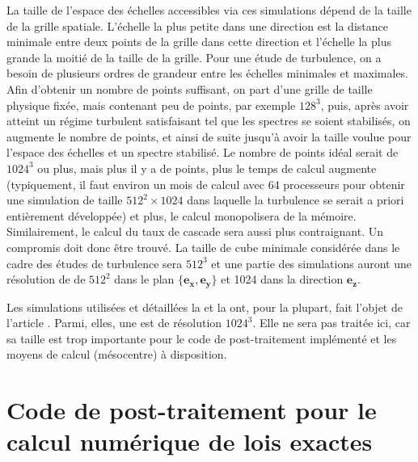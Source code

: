 La taille de l'espace des échelles accessibles via ces simulations dépend de la taille de la grille spatiale. L'échelle la plus petite dans une direction est la distance minimale entre deux points de la grille dans cette direction et l'échelle la plus grande la moitié de la taille de la grille. Pour une étude de turbulence, on a besoin de plusieurs ordres de grandeur entre les échelles minimales et maximales. Afin d'obtenir un nombre de points suffisant, on part d'une grille de taille physique fixée, mais contenant peu de points, par exemple $128^3$, puis, après avoir atteint un régime turbulent satisfaisant tel que les spectres se soient stabilisés, on augmente le nombre de points, et ainsi de suite jusqu'à avoir la taille voulue pour l'espace des échelles et un spectre stabilisé. Le nombre de points idéal serait de $1024^3$ ou plus, mais plus il y a de points, plus le temps de calcul augmente (typiquement, il faut environ un mois de calcul avec 64 processeurs pour obtenir une simulation de taille $512^2\times 1024$ dans laquelle la turbulence se serait a priori entièrement développée) et plus, le calcul monopolisera de la mémoire. Similairement, le calcul du taux de cascade sera aussi plus contraignant. Un compromis doit donc être trouvé. La taille de cube minimale considérée dans le cadre des études de turbulence sera $512^3$ et une partie des simulations auront une résolution de de $512^2$ dans le plan $\{\boldsymbol{e_x},\boldsymbol{e_y}\}$ et 1024 dans la direction $\boldsymbol{e_z}$. 

Les simulations utilisées et détaillées la  et la  ont, pour la plupart, fait l'objet de l'article \cite{ferrand_fluid_2021}. Parmi, elles, une est de résolution $1024^3$. Elle ne sera pas traitée ici, car sa taille est trop importante pour le code de post-traitement implémenté et les moyens de calcul (mésocentre) à disposition. 

\section{Code de post-traitement pour le calcul numérique de lois exactes }
\label{sec-312}

